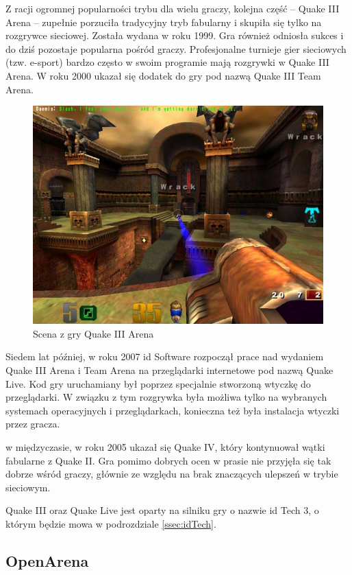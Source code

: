 Z racji ogromnej popularności trybu dla wielu graczy, kolejna część -- Quake III
Arena -- zupełnie porzuciła tradycyjny tryb fabularny i skupiła się tylko na
rozgrywce sieciowej. Została wydana w roku 1999.
Gra również odniosła sukces i do dziś pozostaje popularna
pośród graczy. Profesjonalne turnieje gier sieciowych (tzw. e-sport) bardzo
często w swoim programie mają rozgrywki w Quake III Arena.
W roku 2000 ukazał się dodatek do gry pod nazwą Quake III Team Arena.
\begin{figure}[h]
  \centering
  \includegraphics[scale=0.5]{zasoby/rozdzial2/quake3}  
  \caption{Scena z gry Quake III Arena}
  \label{fig:quake3}
\end{figure}

Siedem lat później, w roku 2007 id Software rozpoczął prace nad wydaniem
Quake III Arena i Team Arena na przeglądarki internetowe pod nazwą Quake Live.
Kod gry uruchamiany był poprzez specjalnie stworzoną wtyczkę do
przeglądarki. W związku z tym rozgrywka była możliwa tylko na wybranych systemach
operacyjnych i przeglądarkach, konieczna też była instalacja wtyczki przez
gracza.

w międzyczasie, w roku 2005 ukazał się Quake IV, który kontynuował wątki fabularne
z Quake II. Gra pomimo dobrych ocen w prasie nie przyjęła się tak dobrze
wśród graczy, głównie ze względu na brak znaczących ulepszeń w trybie sieciowym.

Quake III oraz Quake Live jest oparty na silniku gry o nazwie id Tech 3, o którym
będzie mowa w podrozdziale \ref{ssec:idTech}.

\subsection{OpenArena}
\label{ssec:openArena}

